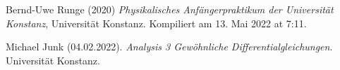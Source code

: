\documentclass[../main.tex]{subfiles}
\begin{document}
	\begin{thebibliography}{99}
		 Bernd-Uwe Runge (2020) \emph{Physikalisches Anfängerpraktikum der Universität Konstanz}, Universität Konstanz. Kompiliert am 13. Mai 2022 at 7:11. 

		 Michael Junk (04.02.2022). \emph{Analysis 3 Gewöhnliche Differentialgleichungen}. Universität Konstanz.


		




\end{thebibliography}
\end{document}
